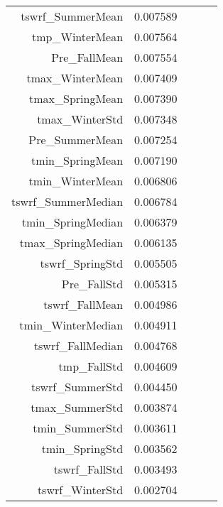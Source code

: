 \begin{tabular}{rrrrr}
tswrf_SummerMean & 0.007589 \\
tmp_WinterMean & 0.007564 \\
Pre_FallMean & 0.007554 \\
tmax_WinterMean & 0.007409 \\
tmax_SpringMean & 0.007390 \\
tmax_WinterStd & 0.007348 \\
Pre_SummerMean & 0.007254 \\
tmin_SpringMean & 0.007190 \\
tmin_WinterMean & 0.006806 \\
tswrf_SummerMedian & 0.006784 \\
tmin_SpringMedian & 0.006379 \\
tmax_SpringMedian & 0.006135 \\
tswrf_SpringStd & 0.005505 \\
Pre_FallStd & 0.005315 \\
tswrf_FallMean & 0.004986 \\
tmin_WinterMedian & 0.004911 \\
tswrf_FallMedian & 0.004768 \\
tmp_FallStd & 0.004609 \\
tswrf_SummerStd & 0.004450 \\
tmax_SummerStd & 0.003874 \\
tmin_SummerStd & 0.003611 \\
tmin_SpringStd & 0.003562 \\
tswrf_FallStd & 0.003493 \\
tswrf_WinterStd & 0.002704 \\
\bottomrule
\end{tabular}
